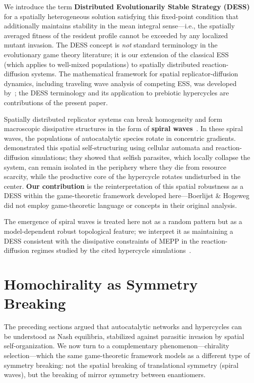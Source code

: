 \documentclass[12pt,a4paper]{article}
\theoremstyle{remark}
\begin{document}
We introduce the term \textbf{Distributed Evolutionarily Stable Strategy (DESS)} for a spatially heterogeneous solution satisfying this fixed-point condition that additionally maintains stability in the mean integral sense---i.e., the spatially averaged fitness of the resident profile cannot be exceeded by any localized mutant invasion. The DESS concept is \emph{not} standard terminology in the evolutionary game theory literature; it is our extension of the classical ESS (which applies to well-mixed populations) to spatially distributed reaction-diffusion systems. The mathematical framework for spatial replicator-diffusion dynamics, including traveling wave analysis of competing ESS, was developed by~\citet{ReplicatorDiffusion}; the DESS terminology and its application to prebiotic hypercycles are contributions of the present paper.

Spatially distributed replicator systems can break homogeneity and form macroscopic dissipative structures in the form of \textbf{spiral waves}~\citep{SpiralWaves}. In these spiral waves, the populations of autocatalytic species rotate in concentric gradients. \citet{SpiralWaves,HypercycleInfinite} demonstrated this spatial self-structuring using cellular automata and reaction-diffusion simulations; they showed that selfish parasites, which locally collapse the system, can remain isolated in the periphery where they die from resource scarcity, while the productive core of the hypercycle rotates undisturbed in the center. \textbf{Our contribution} is the reinterpretation of this spatial robustness as a DESS within the game-theoretic framework developed here---Boerlijst \& Hogeweg did not employ game-theoretic language or concepts in their original analysis.

The emergence of spiral waves is treated here not as a random pattern but as a model-dependent robust topological feature; we interpret it as maintaining a DESS consistent with the dissipative constraints of MEPP in the reaction-diffusion regimes studied by the cited hypercycle simulations~\citep{HypercycleInfinite}.

\section{Homochirality as Symmetry Breaking}
\label{sec:chirality}

The preceding sections argued that autocatalytic networks and hypercycles can be understood as Nash equilibria, stabilized against parasitic invasion by spatial self-organization. We now turn to a complementary phenomenon---chirality selection---which the same game-theoretic framework models as a different type of symmetry breaking: not the spatial breaking of translational symmetry (spiral waves), but the breaking of mirror symmetry between enantiomers.
\end{document}
